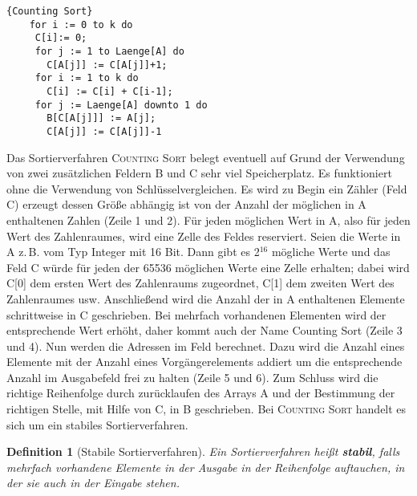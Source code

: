 \documentclass[ngerman,draft,parskip=half*,twoside]{scrreprt}
\theoremstyle{break}
\newtheorem{definition}{Definition}[chapter]
\theoremstyle{nonumberbreak}
\begin{document}
  \begin{Algorithmus}[H]
    \begin{lstlisting}[frame=tlrb, mathescape=true, title=\textsc{Counting Sort}, gobble=4]{Counting Sort}
    for i := 0 to k do
     C[i]:= 0;
     for j := 1 to Laenge[A] do
       C[A[j]] := C[A[j]]+1;
     for i := 1 to k do
       C[i] := C[i] + C[i-1];
     for j := Laenge[A] downto 1 do
       B[C[A[j]]] := A[j];
       C[A[j]] := C[A[j]]-1
    \end{lstlisting}

  Das Sortierverfahren \textsc{Counting Sort}  belegt eventuell auf Grund der Verwendung von zwei zusätzlichen Feldern 
  B und C sehr viel Speicherplatz.
  Es funktioniert ohne die Verwendung von Schlüsselvergleichen. Es wird zu Begin ein Zähler (Feld C) erzeugt 
  dessen Größe abhängig ist von der Anzahl der möglichen in A 
  enthaltenen Zahlen (Zeile 1 und 2). Für jeden möglichen Wert in A, also für jeden Wert des Zahlenraumes, wird eine Zelle des Feldes
  reserviert. Seien die Werte in A z.\,B. vom Typ Integer mit 16 Bit. Dann gibt es 2$^{16}$ mögliche Werte und das Feld C würde für
  jeden der 65536 möglichen Werte eine Zelle erhalten; dabei wird C[0] dem ersten Wert des Zahlenraums zugeordnet, C[1] dem zweiten
  Wert des Zahlenraumes usw.
  Anschließend wird die Anzahl der in 
  A enthaltenen Elemente schrittweise in C geschrieben. Bei mehrfach 
  vorhandenen Elementen wird der entsprechende Wert erhöht, daher kommt auch 
  der Name Counting Sort (Zeile 3 und 4). Nun werden die Adressen im Feld
  berechnet. Dazu wird die Anzahl eines Elemente mit der Anzahl eines 
  Vorgängerelements addiert um die entsprechende Anzahl im Ausgabefeld frei 
  zu halten (Zeile 5 und 6). Zum Schluss wird die richtige Reihenfolge durch 
  zurücklaufen des Arrays A und der Bestimmung der richtigen Stelle, mit Hilfe 
  von C, in B geschrieben. Bei \textsc{Counting Sort} handelt es sich um ein stabiles Sortierverfahren.
  \end{Algorithmus}
  
  \begin{definition}[Stabile Sortierverfahren]
  Ein Sortierverfahren heißt \textbf{stabil}, falls mehrfach vorhandene Elemente in der Ausgabe in der Reihenfolge auftauchen, in der sie auch
  in der Eingabe stehen.
  \end{definition}
  
\end{document}
